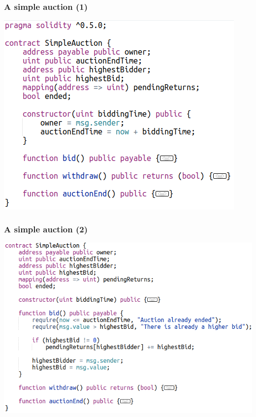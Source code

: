 \documentclass[11pt]{beamer}  %
\begin{document}
\begin{frame}\frametitle{A simple auction (1)}

  \begin{center}
    \includegraphics[scale=0.5,clip=false]{pictures/simple-auction-1.png}
  \end{center}

\end{frame}

\begin{frame}\frametitle{A simple auction (2)}

  \begin{center}
    \includegraphics[scale=0.42,clip=false]{pictures/simple-auction-2.png}
  \end{center}

\end{frame}
\end{document}
